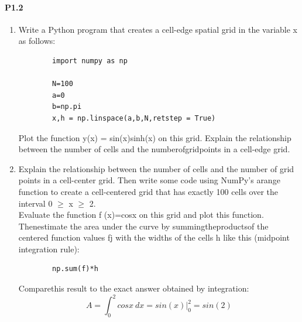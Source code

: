 \documentclass{book}
\theoremstyle{plain}
\theoremstyle{definition}
\numberwithin{exm}{chapter}
\theoremstyle{remark}
\theoremstyle{summary}
\theoremstyle{overview}
\begin{document}
    \paragraph*{P1.2}
    \begin{enumerate}[label=(\alph*)]
    
      \item  Write a Python program that creates a cell-edge spatial grid in the variable x as follows: 
      \begin{lstlisting}
      	import numpy as np
      	
      	N=100
      	a=0
      	b=np.pi
      	x,h = np.linspace(a,b,N,retstep = True)
 		\end{lstlisting}
      Plot the function y(x) = sin(x)sinh(x) on this grid. Explain the relationship between the number of cells and the numberofgridpoints in a cell-edge grid.

    
     
      \item     Explain the relationship between the number of cells and the number of grid points in a cell-center grid. Then write some code using NumPy\rq s arange function to create a cell-centered grid that has exactly 100 cells over the interval 0	$\geq$ x 	$\geq$ 2. 
           \\Evaluate the function f (x)=cosx on this grid and plot this function. Thenestimate the area under the curve by summingtheproductsof the centered function values fj with the widths of the cells h like this (midpoint integration rule):
      
      \begin{lstlisting}
      	np.sum(f)*h
      \end{lstlisting}
      
      Comparethis result to the exact answer obtained by integration: 
      \\      \[A = \int_0^2 cosx \ dx = sin(x) \vert_0^2 = sin(2) \]          
       

\end{enumerate}
\end{document}
